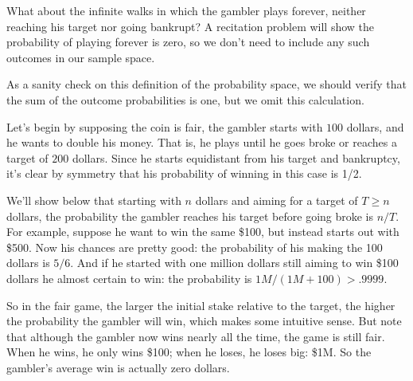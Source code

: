 \begin{editingnotes}
What about the infinite walks in which the gambler plays forever, neither
reaching his target nor going bankrupt?  A recitation problem will show the
probability of playing forever is zero, so we don't need to include any
such outcomes in our sample space.

As a sanity check on this definition of the probability space, we should
verify that the sum of the outcome probabilities is one, but we omit this
calculation.

\iffalse
To do this, we let $X$ be any string of $W$'s and $L$'s, and let $[X]$ be
the event consisting of the outcomes that begin with $X$.  If $X$ itself
is not an outcome but begins with an outcome, then $[X] = \emptyset$ so
$\pr{[X]} = 0$.  On the other hand, if no prefix of $X$ is an outcome,
then it's easy to verify by induction on $k$ that $\pr{[X]} = p^rq^{k-r}$.
length $k$

\textcolor{blue}{COMPLETE}

We'll leave this to the reader.

\fi

\end{editingnotes}



Let's begin by supposing the coin is fair, the gambler starts with $100$
dollars, and he wants to double his money.  That is, he plays until he
goes broke or reaches a target of $200$ dollars.  Since he starts
equidistant from his target and bankruptcy, it's clear by symmetry that
his probability of winning in this case is 1/2.

We'll show below that starting with $n$ dollars and aiming for a target of
$T \geq n$ dollars, the probability the gambler reaches his target before
going broke is $n/T$.  For example, suppose he want to win the same \$100,
but instead starts out with \$500.  Now his chances are pretty good: the
probability of his making the 100 dollars is $5/6$.  And if he started
with one million dollars still aiming to win \$100 dollars he almost
certain to win: the probability is $1M/(1M + 100) > .9999$.

So in the fair game, the larger the initial stake relative to the target,
the higher the probability the gambler will win, which makes some
intuitive sense.  But note that although the gambler now wins nearly all
the time, the game is still fair.  When he wins, he only wins \$100; when
he loses, he loses big: \$1M.  So the gambler's average win is actually
zero dollars.

